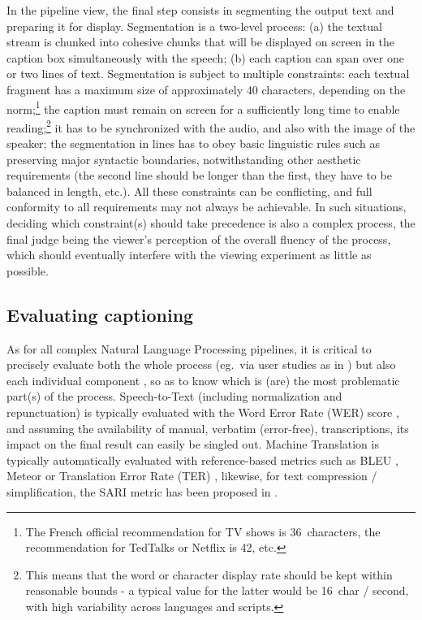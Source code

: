 \documentclass{article}
\begin{document}
In the pipeline view, the final step consists in segmenting the output text and preparing it for display. Segmentation is a two-level process: (a) the textual stream is chunked into cohesive chunks that will be displayed on screen in the caption box simultaneously with the speech; (b) each caption can span over one or two lines of text. Segmentation is subject to multiple constraints: each textual fragment has a maximum size of approximately 40 characters, depending on the norm;\footnote{The French official recommendation for TV shows is 36~characters, the recommendation for TedTalks or Netflix is 42, etc.} the caption must remain on screen for a sufficiently long time to enable reading;\footnote{This means that the word or character display rate should be kept within reasonable bounds - a typical value for the latter would be 16~char / second, with high variability across languages and scripts.} it has to be synchronized with the audio, and also with the image of the speaker; the segmentation in lines has to obey basic linguistic rules such as preserving major syntactic boundaries, notwithstanding other aesthetic requirements (the second line should be longer than the first, they have to be balanced in length, etc.). All these constraints can be conflicting, and full conformity to all requirements may not always be achievable. In such situations, deciding which constraint(s) should take precedence is also a complex process, the final judge being the viewer's perception of the overall fluency of the process, which should eventually interfere with the viewing experiment as little as possible.

\subsection{Evaluating captioning}

As for all complex Natural Language Processing pipelines, it is critical to precisely evaluate both the whole process (eg.\ via user studies as in \cite{Koponen21bridge}) but also each individual component \cite{alvarez-et-al-2016}, so as to know which is (are) the most problematic part(s) of the process. Speech-to-Text (including normalization and repunctuation) is typically evaluated with the Word Error Rate (WER) score \cite{NIST03evalplan}, and assuming the availability of manual, verbatim (error-free), transcriptions, its impact on the final result can easily be singled out. Machine Translation is typically automatically evaluated with reference-based metrics such as BLEU \cite{Papineni02bleu}, Meteor \cite{Banerjee05meteor} or Translation Error Rate (TER) \cite{Snover06study}, likewise, for text compression / simplification, the SARI metric has been proposed in \cite{Wei16optimizing}.
\end{document}

